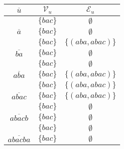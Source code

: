 \small
\begin{tabular}[b]{|c| c |c |}
\hline
\rowcolor{gray!30}\textbf{$\overline{u}$}&$\mathcal{V}_u$&$\mathcal{E}_u$\\
\hline
  \hline
  \rowcolor{gray!10}\multirow{1}{*}{$\overline{e_\mathcal{A}}$}&$\{bac\}$& $\emptyset$ \\ 
 \multirow{1}{*}{$\overline{a}$}&$\{bac\}$& $\emptyset$ \\
\rowcolor{gray!10}
\multirow{1}{*}{$\overline{ab}$}&$\{bac\}$&$\{(aba,abac)\}$ \\
\multirow{1}{*}{$\overline{ba}$}&$\{bac\}$& $\emptyset$ \\
\rowcolor{gray!10}\multirow{1}{*}{$\overline{bc}$}&$\{bac\}$& $\emptyset$ \\ 
\multirow{1}{*}{$\overline{aba}$}&$\{bac\}$& $\{(aba,abac)\}$ \\ 
\rowcolor{gray!10}\multirow{1}{*}{$\overline{abc}$}&$\{bac\}$&$\{(aba,abac)\}$ \\
\multirow{1}{*}{$\overline{abac}$}&$\{bac\}$&$\{(aba,abac)\}$  \\
\rowcolor{gray!10}\multirow{1}{*}{$\overline{bacb}$}&$\{bac\}$& $\emptyset$ \\ 
\multirow{1}{*}{$\overline{abacb}$}&$\{bac\}$& $\emptyset$ \\ 
\rowcolor{gray!10}\multirow{1}{*}{$\overline{bacba}$}&$\{bac\}$& $\emptyset$ \\ 
\multirow{1}{*}{$\overline{abacba}$}&$\{bac\}$& $\emptyset$ \\ 
\hline
\end{tabular}